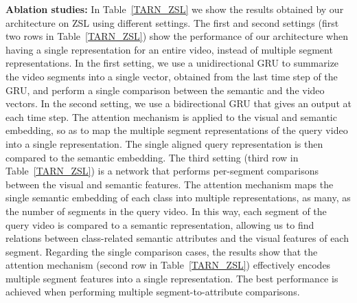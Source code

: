 \textbf{Ablation studies:} In Table~\ref{TARN_ZSL} we show the results obtained by our architecture on ZSL using different settings. The first and second settings (first two rows in Table~\ref{TARN_ZSL}) show the performance of our architecture when having a single representation for an entire video, instead of multiple segment representations. In the first setting, we use a unidirectional GRU to summarize the video segments into a single vector, obtained from the last time step of the GRU, and perform a single comparison between the semantic and the video vectors. In the second setting, we use a bidirectional GRU that gives an output at each time step. The attention mechanism is applied to the visual and semantic embedding, so as to map the multiple segment representations of the query video into a single representation. The single aligned query representation is then compared to the semantic embedding. The third setting (third row in Table~\ref{TARN_ZSL}) is a network that performs per-segment comparisons between the visual and semantic features. The attention mechanism maps the single semantic embedding of each class into multiple representations, as many, as the number of segments in the query video. In this way, each segment of the query video is compared to a semantic representation, allowing us to find relations between class-related semantic attributes and the visual features of each segment. Regarding the single comparison cases, the results show that the attention mechanism (second row in Table~\ref{TARN_ZSL}) effectively encodes multiple segment features into a single representation. The best performance is achieved when performing multiple segment-to-attribute comparisons.




